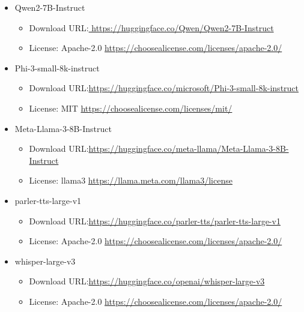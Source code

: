 \documentclass[11pt]{article}
\begin{document}
	\begin{itemize}
		
		\item Qwen2-7B-Instruct
		\begin{itemize}
			\item Download URL:\newline \url{ https://huggingface.co/Qwen/Qwen2-7B-Instruct}
			\item License: Apache-2.0 \newline \url{https://choosealicense.com/licenses/apache-2.0/}
		\end{itemize}
		
		\item Phi-3-small-8k-instruct
		\begin{itemize}
			\item Download URL:\newline \url{https://huggingface.co/microsoft/Phi-3-small-8k-instruct}
			\item License: MIT \newline \url{https://choosealicense.com/licenses/mit/}
		\end{itemize}
		
		\item Meta-Llama-3-8B-Instruct
		\begin{itemize}
			\item Download URL:\newline \url{https://huggingface.co/meta-llama/Meta-Llama-3-8B-Instruct}
			\item License: llama3 \newline \url{https://llama.meta.com/llama3/license}
		\end{itemize}
		
		\item parler-tts-large-v1
		\begin{itemize}
			\item Download URL:\newline \url{https://huggingface.co/parler-tts/parler-tts-large-v1}
			\item License: Apache-2.0  \newline \url{https://choosealicense.com/licenses/apache-2.0/}
		\end{itemize}
		
		\item whisper-large-v3
		\begin{itemize}
			\item Download URL:\newline \url{https://huggingface.co/openai/whisper-large-v3}
			\item License: Apache-2.0  \newline \url{https://choosealicense.com/licenses/apache-2.0/}
		\end{itemize}
		

\end{itemize}
\end{document}
